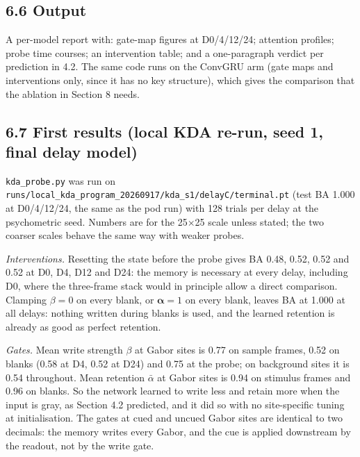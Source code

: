 \documentclass[

]{article}
\begin{document}
\subsection{6.6 Output}\label{output}



A per-model report with: gate-map figures at D0/4/12/24; attention profiles; probe time courses; an intervention table; and a one-paragraph verdict per prediction in 4.2. The same code runs on the ConvGRU arm (gate maps and interventions only, since it has no key structure), which gives the comparison that the ablation in Section 8 needs.



\subsection{6.7 First results (local KDA re-run, seed 1, final delay model)}\label{first-results-local-kda-re-run-seed-1-final-delay-model}



\texttt{kda\_probe.py} was run on \texttt{runs/local\_kda\_program\_20260917/kda\_s1/delayC/terminal.pt} (test BA 1.000 at D0/4/12/24, the same as the pod run) with 128 trials per delay at the psychometric seed. Numbers are for the 25×25 scale unless stated; the two coarser scales behave the same way with weaker probes.



\emph{Interventions.} Resetting the state before the probe gives BA 0.48, 0.52, 0.52 and 0.52 at D0, D4, D12 and D24: the memory is necessary at every delay, including D0, where the three-frame stack would in principle allow a direct comparison. Clamping \(\beta=0\) on every blank, or \(\boldsymbol\alpha=1\) on every blank, leaves BA at 1.000 at all delays: nothing written during blanks is used, and the learned retention is already as good as perfect retention.



\emph{Gates.} Mean write strength \(\beta\) at Gabor sites is 0.77 on sample frames, 0.52 on blanks (0.58 at D4, 0.52 at D24) and 0.75 at the probe; on background sites it is 0.54 throughout. Mean retention \(\bar\alpha\) at Gabor sites is 0.94 on stimulus frames and 0.96 on blanks. So the network learned to write less and retain more when the input is gray, as Section 4.2 predicted, and it did so with no site-specific tuning at initialisation. The gates at cued and uncued Gabor sites are identical to two decimals: the memory writes every Gabor, and the cue is applied downstream by the readout, not by the write gate.
\end{document}
